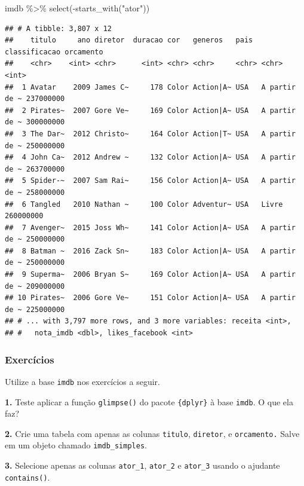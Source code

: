 \documentclass[
]{book}
\newenvironment{Shaded}{\begin{snugshade}}{\end{snugshade}}
\newcommand{\FunctionTok}[1]{\textcolor[rgb]{0.00,0.00,0.00}{#1}}
\newcommand{\NormalTok}[1]{#1}
\newcommand{\SpecialCharTok}[1]{\textcolor[rgb]{0.00,0.00,0.00}{#1}}
\newcommand{\StringTok}[1]{\textcolor[rgb]{0.31,0.60,0.02}{#1}}
\begin{document}
\begin{Shaded}
\begin{Highlighting}[]
\NormalTok{imdb }\SpecialCharTok{\%\textgreater{}\%}
  \FunctionTok{select}\NormalTok{(}\SpecialCharTok{{-}}\FunctionTok{starts\_with}\NormalTok{(}\StringTok{"ator"}\NormalTok{))}
\end{Highlighting}
\end{Shaded}

\begin{verbatim}
## # A tibble: 3,807 x 12
##    titulo     ano diretor  duracao cor   generos   pais  classificacao orcamento
##    <chr>    <int> <chr>      <int> <chr> <chr>     <chr> <chr>             <int>
##  1 Avatar    2009 James C~     178 Color Action|A~ USA   A partir de ~ 237000000
##  2 Pirates~  2007 Gore Ve~     169 Color Action|A~ USA   A partir de ~ 300000000
##  3 The Dar~  2012 Christo~     164 Color Action|T~ USA   A partir de ~ 250000000
##  4 John Ca~  2012 Andrew ~     132 Color Action|A~ USA   A partir de ~ 263700000
##  5 Spider-~  2007 Sam Rai~     156 Color Action|A~ USA   A partir de ~ 258000000
##  6 Tangled   2010 Nathan ~     100 Color Adventur~ USA   Livre         260000000
##  7 Avenger~  2015 Joss Wh~     141 Color Action|A~ USA   A partir de ~ 250000000
##  8 Batman ~  2016 Zack Sn~     183 Color Action|A~ USA   A partir de ~ 250000000
##  9 Superma~  2006 Bryan S~     169 Color Action|A~ USA   A partir de ~ 209000000
## 10 Pirates~  2006 Gore Ve~     151 Color Action|A~ USA   A partir de ~ 225000000
## # ... with 3,797 more rows, and 3 more variables: receita <int>,
## #   nota_imdb <dbl>, likes_facebook <int>
\end{verbatim}

\hypertarget{exercuxedcios-11}{%
\subsubsection*{Exercícios}\label{exercuxedcios-11}}

Utilize a base \texttt{imdb} nos exercícios a seguir.

\textbf{1.} Teste aplicar a função \texttt{glimpse()} do pacote \texttt{\{dplyr\}} à base \texttt{imdb}. O que ela faz?

\textbf{2.} Crie uma tabela com apenas as colunas \texttt{titulo}, \texttt{diretor}, e \texttt{orcamento.} Salve em um objeto chamado \texttt{imdb\_simples}.

\textbf{3.} Selecione apenas as colunas \texttt{ator\_1}, \texttt{ator\_2} e \texttt{ator\_3} usando o ajudante \texttt{contains()}.
\end{document}
